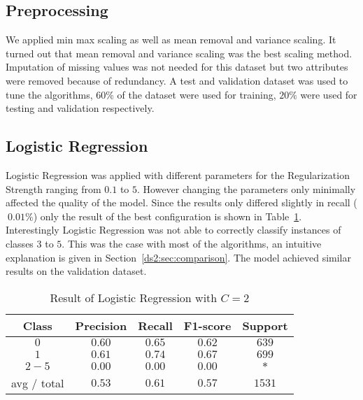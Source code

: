 \subsection{Preprocessing}
We applied min max scaling as well as mean removal and variance scaling. It turned out that mean removal and variance scaling was the best scaling method. Imputation of missing values was not needed for this dataset but two attributes were removed because of redundancy. A test and validation dataset was used to tune the algorithms, $60\%$ of the dataset were used for training, $20\%$ were used for testing and validation respectively. 
\subsection{Logistic Regression}
Logistic Regression was applied with different parameters for the Regularization Strength ranging from $0.1$ to $5$. However changing the parameters only minimally affected the quality of the model. Since the results only differed slightly in recall ($~0.01\%$) only the result of the best configuration is shown in Table~\ref{ds2:table:lr}. Interestingly Logistic Regression was not able to correctly classify instances of classes $3$ to $5$. This was the case with most of the algorithms, an intuitive explanation is given in Section~\ref{ds2:sec:comparison}. The model achieved similar results on the validation dataset.

\begin{table}[p]
\begin{center}
\begin{tabular}{|c|c|c|c|c|}
\hline Class & Precision & Recall & F1-score & Support \\
\hline  $0$    &   $0.60$    & $ 0.65$  &   $ 0.62$  &     $639$ \\
\hline  $1$    &   $0.61$    &  $0.74$  &   $ 0.67$  &     $699$ \\
\hline  $2-5$  &   $0.00$    &  $0.00$  &    $0.00$  &     $*$ \\
\hline avg / total &      $0.53$  &    $0.61$  &    $0.57$  &   $1531$\\
\hline
\end{tabular}

\caption{Result of Logistic Regression with $C=2$}
\label{ds2:table:lr}
\end{center}
\end{table}


